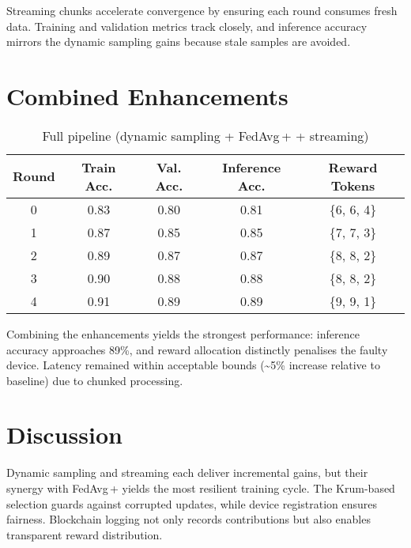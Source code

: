 Streaming chunks accelerate convergence by ensuring each round consumes fresh data. Training and validation metrics track closely, and inference accuracy mirrors the dynamic sampling gains because stale samples are avoided.

\section{Combined Enhancements}

\begin{table}[h!]
    \centering
    \caption{Full pipeline (dynamic sampling + FedAvg\,+ + streaming)}
    \label{tab:combined_results}
    \begin{tabular}{c c c c c}
        \toprule
        \textbf{Round} & \textbf{Train Acc.} & \textbf{Val. Acc.} & \textbf{Inference Acc.} & \textbf{Reward Tokens} \\
        \midrule
        0 & 0.83 & 0.80 & 0.81 & \{6, 6, 4\} \\
        1 & 0.87 & 0.85 & 0.85 & \{7, 7, 3\} \\
        2 & 0.89 & 0.87 & 0.87 & \{8, 8, 2\} \\
        3 & 0.90 & 0.88 & 0.88 & \{8, 8, 2\} \\
        4 & 0.91 & 0.89 & 0.89 & \{9, 9, 1\} \\
        \bottomrule
    \end{tabular}
\end{table}

Combining the enhancements yields the strongest performance: inference accuracy approaches 89\%, and reward allocation distinctly penalises the faulty device. Latency remained within acceptable bounds (\textasciitilde5\% increase relative to baseline) due to chunked processing.

\section{Discussion}

Dynamic sampling and streaming each deliver incremental gains, but their synergy with FedAvg\,+ yields the most resilient training cycle. The Krum-based selection guards against corrupted updates, while device registration ensures fairness. Blockchain logging not only records contributions but also enables transparent reward distribution.

